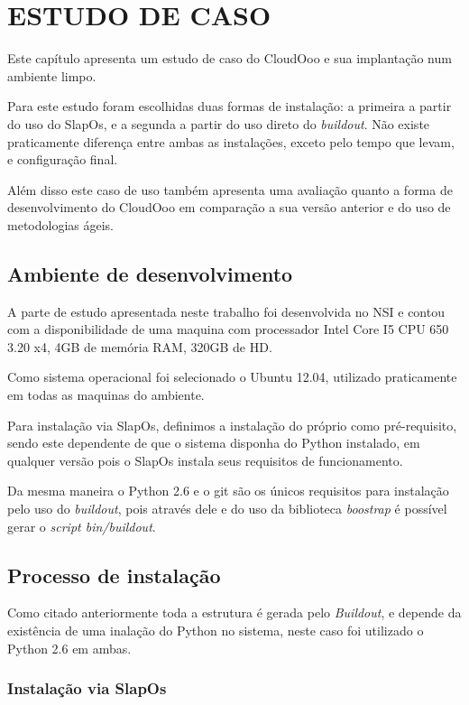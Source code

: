 \chapter{ESTUDO DE CASO}

Este capítulo apresenta um estudo de caso do CloudOoo e sua implantação num ambiente limpo.

Para este estudo foram escolhidas duas formas de instalação: a primeira a partir do uso do SlapOs, e a segunda a partir do uso direto do \textit{buildout}. Não existe praticamente diferença entre ambas as instalações, exceto pelo tempo que levam, e configuração final.

Além disso este caso de uso também apresenta uma avaliação quanto a forma de desenvolvimento do CloudOoo em comparação a sua versão anterior e do uso de metodologias ágeis.

\section{Ambiente de desenvolvimento}

A parte de estudo apresentada neste trabalho foi desenvolvida no NSI e contou com a disponibilidade de uma maquina com processador Intel Core I5 CPU 650 3.20 x4, 4GB de memória RAM, 320GB de HD.

Como sistema operacional foi selecionado o Ubuntu 12.04, utilizado praticamente em todas as maquinas do ambiente.

Para instalação via SlapOs, definimos a instalação do próprio como pré-requisito, sendo este dependente de que o sistema disponha do Python instalado, em qualquer versão pois o SlapOs instala seus requisitos de funcionamento.

Da mesma maneira o Python 2.6 e o git são os únicos requisitos para instalação pelo uso do \textit{buildout}, pois através dele e do uso da biblioteca \textit{boostrap} é possível gerar o \textit{script bin/buildout}.

\section{Processo de instalação}

Como citado anteriormente toda a estrutura é gerada pelo \textit{Buildout}, e depende da existência de uma inalação do Python no sistema, neste caso foi utilizado o Python 2.6 em ambas.

\subsection{Instalação via SlapOs}

